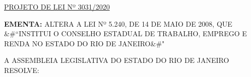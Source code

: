 \documentclass[10pt]{article}
\date{}
\begin{document}
\maketitle
\begin{center}
  \huge
  \vspace{-3cm}\href{http://alerjln1.alerj.rj.gov.br/scpro1923.nsf/f4b46b3cdbba990083256cc900746cf6/9d2ef1aac02a86a5032585cb005dda58?OpenDocument}{PROJETO DE LEI Nº 3031/2020}
\bigskip
\bigskip
\bigskip
  
\end{center}

\textbf{EMENTA:} 
ALTERA A LEI Nº 5.240, DE 14 DE MAIO DE 2008, QUE &#``INSTITUI O CONSELHO ESTADUAL DE TRABALHO, EMPREGO E RENDA NO ESTADO DO RIO DE JANEIRO&#"








\bigskip

\noindent
A ASSEMBLEIA LEGISLATIVA DO ESTADO DO RIO DE JANEIRO RESOLVE:
\end{document}
